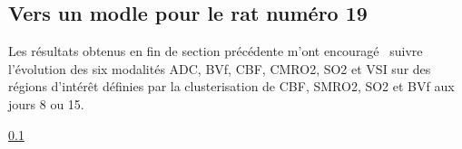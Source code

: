 











\FloatBarrier
\subsection{Vers un modle pour le rat num\'ero 19}

Les r\'esultats obtenus en fin de section pr\'ec\'edente m'ont encourag\'e  suivre l'\'evolution des six modalit\'es %
ADC, BVf, CBF, CMRO2, SO2 et VSI sur des r\'egions d'int\'er\^et d\'efinies par la clusterisation de CBF, SMRO2, SO2 et BVf aux jours 8 ou 15.


\ref{}





